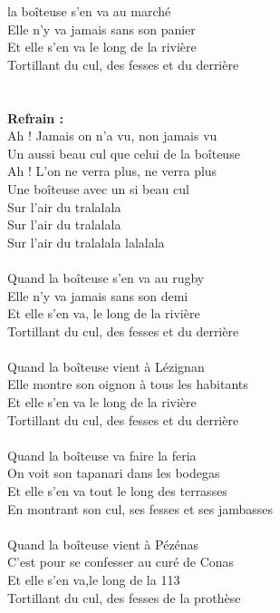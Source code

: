 %
 la boîteuse s'en va au marché ~~ \bissimple
\\Elle n'y va jamais sans son panier ~~ \bissimple
\\Et elle s'en va le long de la rivière
\\Tortillant du cul, des fesses et du derrière
\\\\\\\textbf{Refrain :} 
\\Ah ! Jamais on n'a vu, non jamais vu
\\Un aussi beau cul que celui de la boîteuse
\\Ah ! L'on ne verra plus, ne verra plus
\\Une boîteuse avec un si beau cul
\\Sur l'air du tralalala
\\Sur l'air du tralalala
\\Sur l'air du tralalala lalalala
\\\\Quand la boîteuse s'en va au rugby ~~ \bissimple
\\Elle n'y va jamais sans son demi ~~~~~~ \bissimple
\\Et elle s'en va, le long de la rivière
\\Tortillant du cul, des fesses et du derrière
\\\\Quand la boîteuse vient à Lézignan ~~~~~~~~~~~ \bissimple
\\Elle montre son oignon à tous les habitants ~~\bissimple
\\Et elle s'en va le long de la rivière
\\Tortillant du cul, des fesses et du derrière
\\\\Quand la boîteuse va faire la feria ~~~~~~~~~~\bissimple
\\On voit son tapanari dans les bodegas ~~~~ \bissimple
\\Et elle s'en va tout le long des terrasses
\\En montrant son cul, ses fesses et ses jambasses
\\\\Quand la boîteuse vient à Pézénas  ~~~~~~~~~~~~ \bissimple
\\C'est pour se confesser au curé de Conas ~~~~ \bissimple %
\\Et elle s'en va,le long de la 113
\\Tortillant du cul, des fesses de la prothèse

\breakpage